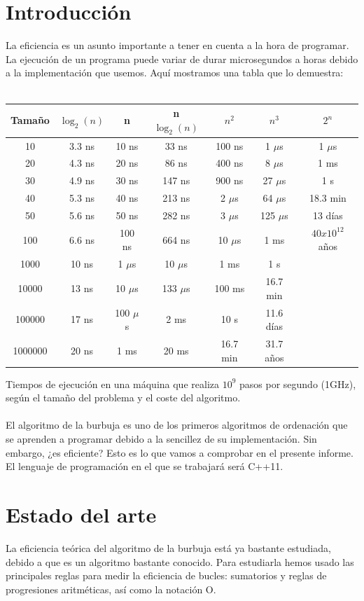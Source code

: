\documentclass[a4paper,11pt]{article}
\begin{document}
\section{Introducción}
La eficiencia es un asunto importante a tener en cuenta a la hora de programar. La ejecución de un programa puede variar de durar microsegundos a horas debido a la implementación que usemos. Aquí mostramos una tabla que lo demuestra: \\ \\
\begin{tabular}{|c||c||c||c||c||c||c|}
\hline
Tamaño & $\log_{2}(n)$ & n & n $\log_{2}(n)$ & $n^2$ & $n^3$ & $2^n$ \\
\hline
10 & 3.3 ns & 10 ns & 33 ns & 100 ns & 1 $\mu$s & 1 $\mu$s \\
\hline 
20 & 4.3 ns & 20 ns & 86 ns & 400 ns & 8 $\mu$s & 1 ms \\
\hline
30 & 4.9 ns & 30 ns & 147 ns & 900 ns & 27 $\mu$s & 1 s \\
\hline
40 & 5.3 ns & 40 ns & 213 ns & 2 $\mu$s & 64 $\mu$s & 18.3 min \\
\hline
50 & 5.6 ns & 50 ns & 282 ns & 3 $\mu$s & 125 $\mu$s & 13 días \\
\hline
100 & 6.6 ns & 100 ns & 664 ns & 10 $\mu$s & 1 ms & $40x10^12$ años \\
\hline
1000 & 10 ns & 1 $\mu$s & 10 $\mu$s & 1 ms & 1 s & \\
\hline
10000 & 13 ns & 10 $\mu$s & 133 $\mu$s & 100 ms & 16.7 min &\\
\hline
100000 & 17 ns & 100 $\mu$s & 2 ms & 10 s & 11.6 días & \\
\hline
1000000 & 20 ns & 1 ms & 20 ms & 16.7 min  & 31.7 años & \\
\hline
\end{tabular}
Tiempos de ejecución en una máquina que realiza $10^9$ pasos por segundo (1GHz), según el tamaño del problema y el coste del algoritmo.
\\ \\
El algoritmo de la burbuja es uno de los primeros algoritmos de ordenación que se aprenden a programar debido a la sencillez de su implementación. Sin embargo, ¿es eficiente? Esto es lo que vamos a comprobar en el presente informe. El lenguaje de programación en el que se trabajará será C++11.
\section{Estado del arte}
La eficiencia teórica del algoritmo de la burbuja está ya bastante estudiada, debido a que es un algoritmo bastante conocido. Para estudiarla hemos usado las principales reglas para medir la eficiencia de bucles: sumatorios y reglas de progresiones aritméticas, así como la notación O.
\end{document}
